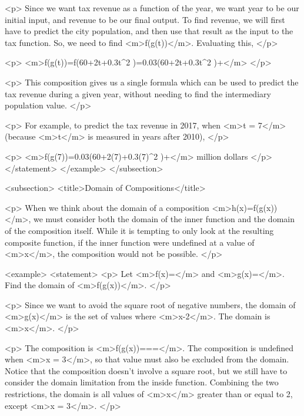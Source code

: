                 <p>
                    Since we want tax revenue as a function of the year, we want year to be our initial input, and revenue to be our final output.
                    To find revenue, we will first have to predict the city population, and then use that result as the input to the tax function.
                    So, we need to find <m>f(g(t))</m>.
                    Evaluating this,
                </p>

                <p>
                    <m>f(g(t))=f(60+2t+0.3t^{2} )=0.03(60+2t+0.3t^{2} )+</m>
                </p>

                <p>
                    This composition gives us a single formula which can be used to predict the tax revenue during a given year, without needing to find the intermediary population value.
                </p>

                <p>
                    For example, to predict the tax revenue in 2017, when <m>t = 7</m> (because <m>t</m> is measured in years after 2010),
                </p>

                <p>
                    <m>f(g(7))=0.03(60+2(7)+0.3(7)^{2} )+</m> million dollars
                </p>
            </statement>
        </example>
    </subsection>


    <subsection>
        <title>Domain of Compositions</title>

        <p>
            When we think about the domain of a composition <m>h(x)=f(g(x))</m>, we must consider both the domain of the inner function and the domain of the composition itself.
            While it is tempting to only look at the resulting composite function, if the inner function were undefined at a value of <m>x</m>, the composition would not be possible.
        </p>

        <example>
            <statement>
                <p>
                    Let <m>f(x)=</m> and <m>g(x)=</m>.
                    Find the domain of <m>f(g(x))</m>.
                </p>

                <p>
                    Since we want to avoid the square root of negative numbers, the domain of <m>g(x)</m> is the set of values where <m>x-2</m>.
                    The domain is <m>x</m>.
                </p>

                <p>
                    The composition is <m>f(g(x))===</m>.
                    The composition is undefined when <m>x = 3</m>, so that value must also be excluded from the domain.
                    Notice that the composition doesn’t involve a square root, but we still have to consider the domain limitation from the inside function.
                    Combining the two restrictions, the domain is all values of <m>x</m> greater than or equal to 2, except <m>x = 3</m>.
                </p>


